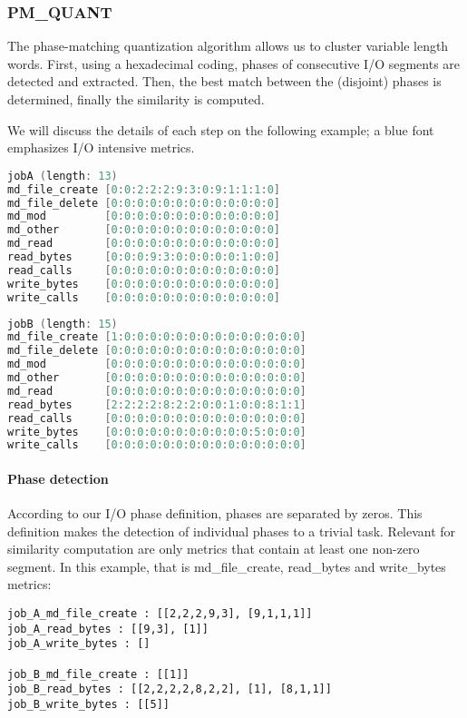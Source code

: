 \documentclass{jhps}
\begin{document}
\subsubsection{PM\_QUANT}
The phase-matching quantization algorithm allows us to cluster variable length words.
First, using a hexadecimal coding, phases of consecutive I/O segments are detected and extracted.
Then, the best match between the (disjoint) phases is determined, finally the similarity is computed.

We will discuss the details of each step on the following example; a blue font emphasizes I/O intensive  metrics.

\begin{lstlisting}[language=C,morekeywords={md_file_create,read_bytes}]
jobA (length: 13)
md_file_create [0:0:2:2:2:9:3:0:9:1:1:1:0]
md_file_delete [0:0:0:0:0:0:0:0:0:0:0:0:0]
md_mod         [0:0:0:0:0:0:0:0:0:0:0:0:0]
md_other       [0:0:0:0:0:0:0:0:0:0:0:0:0]
md_read        [0:0:0:0:0:0:0:0:0:0:0:0:0]
read_bytes     [0:0:0:9:3:0:0:0:0:0:1:0:0]
read_calls     [0:0:0:0:0:0:0:0:0:0:0:0:0]
write_bytes    [0:0:0:0:0:0:0:0:0:0:0:0:0]
write_calls    [0:0:0:0:0:0:0:0:0:0:0:0:0]
\end{lstlisting}

\vspace*{-0.5em}

\begin{lstlisting}[language=C,morekeywords={md_file_create,read_bytes,write_bytes}]
jobB (length: 15)
md_file_create [1:0:0:0:0:0:0:0:0:0:0:0:0:0:0]
md_file_delete [0:0:0:0:0:0:0:0:0:0:0:0:0:0:0]
md_mod         [0:0:0:0:0:0:0:0:0:0:0:0:0:0:0]
md_other       [0:0:0:0:0:0:0:0:0:0:0:0:0:0:0]
md_read        [0:0:0:0:0:0:0:0:0:0:0:0:0:0:0]
read_bytes     [2:2:2:2:8:2:2:0:0:1:0:0:8:1:1]
read_calls     [0:0:0:0:0:0:0:0:0:0:0:0:0:0:0]
write_bytes    [0:0:0:0:0:0:0:0:0:0:0:5:0:0:0]
write_calls    [0:0:0:0:0:0:0:0:0:0:0:0:0:0:0]
\end{lstlisting}

\paragraph{Phase detection}
According to our I/O phase definition, phases are separated by zeros.
This definition makes the detection of individual phases to a trivial task.
Relevant for similarity computation are only metrics that contain at least one non-zero segment.
In this example, that is md\_file\_create, read\_bytes and write\_bytes metrics:
\begin{lstlisting}
job_A_md_file_create : [[2,2,2,9,3], [9,1,1,1]]
job_A_read_bytes : [[9,3], [1]]
job_A_write_bytes : []

job_B_md_file_create : [[1]]
job_B_read_bytes : [[2,2,2,2,8,2,2], [1], [8,1,1]]
job_B_write_bytes : [[5]]
\end{lstlisting}
\end{document}
